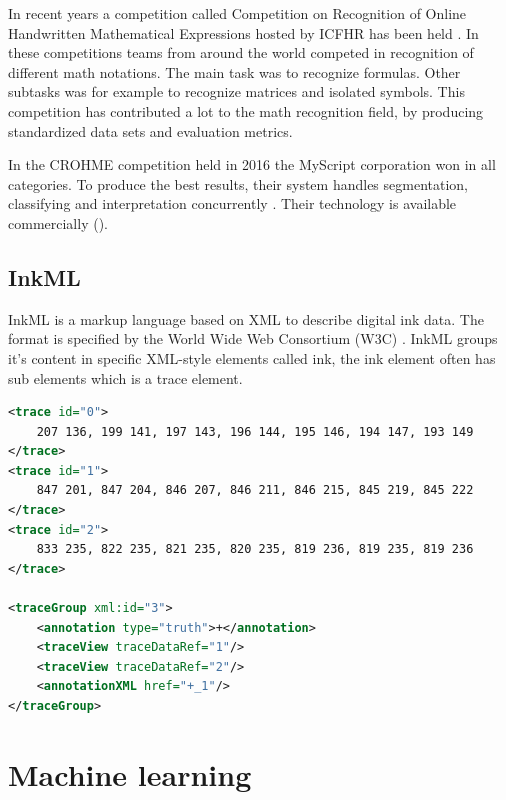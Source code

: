 In recent years a competition called Competition on Recognition of Online Handwritten Mathematical Expressions hosted by ICFHR has been held \cite{mouchere_icfhr2016_2016} \cite{mouchere_advancing_2016}. In these competitions teams from around the world competed in recognition of different math notations. The main task was to recognize formulas. Other subtasks was for example to recognize matrices and isolated symbols. This competition has contributed a lot to the math recognition field, by producing standardized data sets and evaluation metrics.

In the CROHME competition held in 2016 the MyScript corporation won in all categories. To produce the best results, their system handles segmentation, classifying and interpretation concurrently \cite{mouchere_icfhr2016_2016}. Their technology is available commercially (\mydate).

\subsection{InkML}
InkML is a markup language based on XML to describe digital ink data. The format is specified by the World Wide Web Consortium (W3C) \cite{chee_ink_2011}. InkML groups it's content in specific XML-style elements called ink, the ink element often has sub elements which is a trace element.\\

\begin{minipage}{\linewidth}
\begin{lstlisting}[language=XML, %
label={lst:InkML_ex},
caption={\textbf{\gls{InkML}} example of three traces, each with an file-unique id. In addition to traces, we have listed a tracegroup, which specifies what and where the traces belong to. Truths are used when providing labels to use in supervised learning, which is explained later in this chapter.}]
<trace id="0">
    207 136, 199 141, 197 143, 196 144, 195 146, 194 147, 193 149
</trace>
<trace id="1">
    847 201, 847 204, 846 207, 846 211, 846 215, 845 219, 845 222
</trace>
<trace id="2">
    833 235, 822 235, 821 235, 820 235, 819 236, 819 235, 819 236
</trace>

<traceGroup xml:id="3">
	<annotation type="truth">+</annotation>
	<traceView traceDataRef="1"/>
	<traceView traceDataRef="2"/>
	<annotationXML href="+_1"/>
</traceGroup>
\end{lstlisting}
\end{minipage}

\section{Machine learning}
\label{machine_learning}

